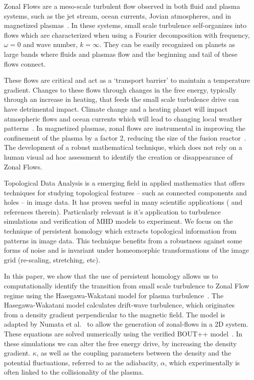 \documentclass[pdflatex,sn-aps]{sn-jnl}%
\theoremstyle{thmstyleone}%
\theoremstyle{thmstyletwo}%
\theoremstyle{thmstylethree}%
\begin{document}
\par
Zonal Flows are a meso-scale turbulent flow observed in both fluid and plasma systems, such as the jet stream, ocean currents, Jovian atmospheres, and in magnetized plasmas~\cite{VASAVADA2005, VALLIS2017, DIAMOND2005}. In these systems, small scale turbulence self-organizes into flows which are characterized when using a Fourier decomposition with frequency, $\omega=0$ and wave number, $k=\infty$. They can be easily recognized on planets as large bands where fluids and plasmas flow and the beginning and tail of these flows connect.
\par
These flows are critical and act as a `transport barrier' to maintain a temperature gradient. Changes to these flows through changes in the free energy, typically through an increase in heating, that feeds the small scale turbulence drive can have detrimental impact. Climate change and a heating planet will impact atmospheric flows and ocean currents which will lead to changing local weather patterns~\cite{STENDEL2021}. In magnetized plasmas, zonal flows are instrumental in improving the confinement of the plasma by a factor 2, reducing the size of the fusion reactor~\cite{KEILHACKER1987}. The development of a robust mathematical technique, which does not rely on a human visual ad hoc assessment to identify the creation or disappearance of Zonal Flows.
\par
Topological Data Analysis is a emerging field in applied mathematics that offers techniques for studying topological features -- such as connected components and holes -- in image data.  It has proven useful in many scientific applications (\cite{} and references therein).  Particularly relevant is it's application to turbulence simulations\cite{} and verification of MHD models to experiment\cite{}.  We focus on the technique of persistent homology which extracts topological information from patterns in image data.  This technique benefits from a robustness against some forms of noise and is invariant under homeomorphic transformations of the image grid (re-scaling, stretching, etc).

In this paper, we show that the use of persistent homology allows us to computationally identify the transition from small scale turbulence to Zonal Flow regime using the Hasegawa-Wakatani model for plasma turbulence~\cite{HASEGAWA1983}. The Hasegawa-Wakatani model calculates drift-wave turbulence, which originates from a density gradient perpendicular to the magnetic field. The model is adapted by Numata et al.~\cite{NUMATA2007} to allow the generation of zonal-flows in a 2D system. These equations are solved numerically using the verified BOUT++ model~\cite{DUDSON2016}. In these simulations we can alter the free energy drive, by increasing the density gradient. $\kappa$, as well as the coupling parameters between the density and the potential fluctuations, referred to as the adiabacity, $\alpha$, which experimentally is often linked to the collisionality of the plasma.
\end{document}
